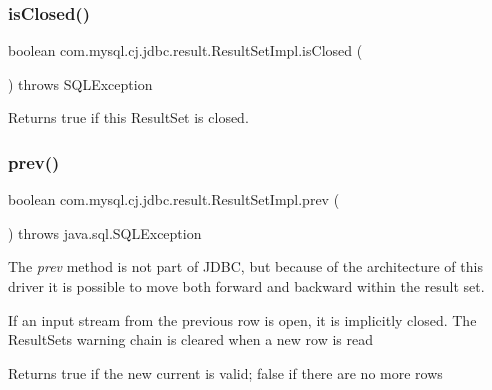 \mbox{\label{classcom_1_1mysql_1_1cj_1_1jdbc_1_1result_1_1_result_set_impl_a348d7112c64ce23460634afa8e0fa748}} 
\subsubsection{\texorpdfstring{is\+Closed()}{isClosed()}}
{\footnotesize\ttfamily boolean com.\+mysql.\+cj.\+jdbc.\+result.\+Result\+Set\+Impl.\+is\+Closed (\begin{DoxyParamCaption}{ }\end{DoxyParamCaption}) throws S\+Q\+L\+Exception}

Returns true if this Result\+Set is closed. \mbox{\label{classcom_1_1mysql_1_1cj_1_1jdbc_1_1result_1_1_result_set_impl_a8ee52e92f7e5e671bf694f728936171e}} 
\subsubsection{\texorpdfstring{prev()}{prev()}}
{\footnotesize\ttfamily boolean com.\+mysql.\+cj.\+jdbc.\+result.\+Result\+Set\+Impl.\+prev (\begin{DoxyParamCaption}{ }\end{DoxyParamCaption}) throws java.\+sql.\+S\+Q\+L\+Exception}

The {\itshape prev} method is not part of J\+D\+BC, but because of the architecture of this driver it is possible to move both forward and backward within the result set.

If an input stream from the previous row is open, it is implicitly closed. The Result\+Set\textquotesingle{}s warning chain is cleared when a new row is read 

\begin{DoxyReturn}{Returns}
true if the new current is valid; false if there are no more rows
\end{DoxyReturn}


